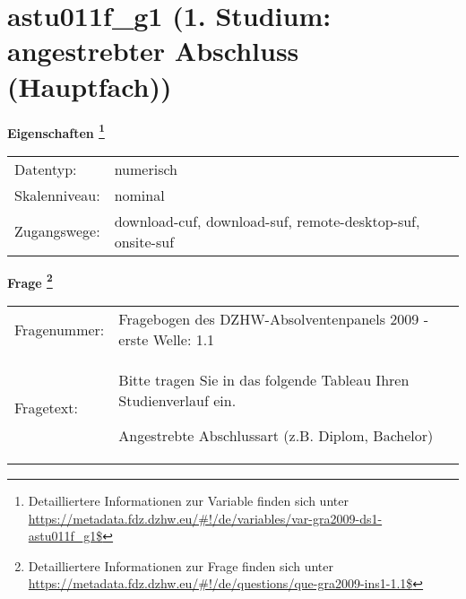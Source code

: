
    \setcounter{footnote}{0}

    \vspace*{-1.8cm}
	\section{astu011f\_g1 (1. Studium: angestrebter Abschluss (Hauptfach))}
	\label{section:astu011f_g1}



    \vspace*{0.5cm}
    \noindent\textbf{Eigenschaften
	\footnote{Detailliertere Informationen zur Variable finden sich unter
		\url{https://metadata.fdz.dzhw.eu/\#!/de/variables/var-gra2009-ds1-astu011f_g1$}}}\\
	\begin{tabularx}{\hsize}{@{}lX}
	Datentyp: & numerisch \\
	Skalenniveau: & nominal \\
	Zugangswege: &
	  download-cuf, 
	  download-suf, 
	  remote-desktop-suf, 
	  onsite-suf
 \\
    \end{tabularx}



				\vspace*{0.5cm}
                \noindent\textbf{Frage
	                \footnote{Detailliertere Informationen zur Frage finden sich unter
		              \url{https://metadata.fdz.dzhw.eu/\#!/de/questions/que-gra2009-ins1-1.1$}}}\\
				\begin{tabularx}{\hsize}{@{}lX}
					Fragenummer: &
					  Fragebogen des DZHW-Absolventenpanels 2009 - erste Welle:
					  1.1
 \\
					Fragetext: & Bitte tragen Sie in das folgende Tableau Ihren Studienverlauf ein.\par  Angestrebte Abschlussart (z.B. Diplom, Bachelor) \\
				\end{tabularx}





